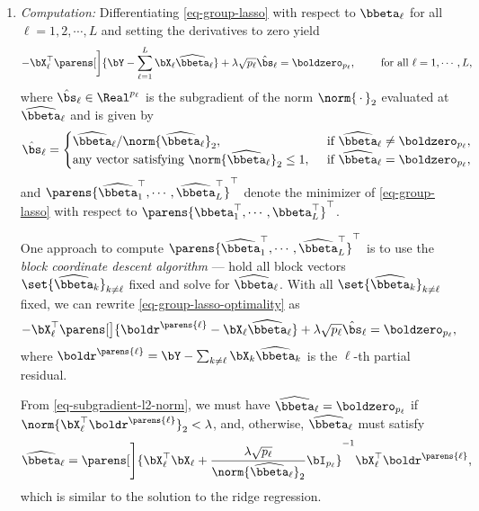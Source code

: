 \documentclass[12pt]{article}
\begin{document}
\begin{enumerate}[label=\textbf{\arabic*.}]
\begin{enumerate}
		\item \textit{Computation:} Differentiating \eqref{eq-group-lasso} with respect to $\bbeta_{\ell}$ for all $\ell = 1, 2, \cdots, L$ and setting the derivatives to zero yield 
		\begin{align}\label{eq-group-lasso-optimality}
			- \bX_{\ell}^\top \parens[\bigg]{\bY - \sum_{\ell=1}^L \bX_{\ell} \widehat{\bbeta}_{\ell} } + \lambda \sqrt{p_{\ell}} \hat{\bs}_{\ell} = \boldzero_{p_{\ell}}, \qquad \text{ for all } \ell = 1, \cdots, L, 
		\end{align}
		where $\hat{\bs}_{\ell} \in \Real^{p_{\ell}}$ is the subgradient of the norm $\norm{\,\cdot\,}_2$ evaluated at $\widehat{\bbeta}_{\ell}$ and is given by 
		\begin{align}\label{eq-subgradient-l2-norm}
			\hat{\bs}_{\ell} = \begin{cases}
				\widehat{\bbeta}_{\ell} / \norm{\widehat{\bbeta}_{\ell}}_2, & \, \text{ if } \widehat{\bbeta}_{\ell} \neq \boldzero_{p_\ell}, \\ 
				\text{any vector satisfying } \norm{\widehat{\bbeta}_{\ell}}_2 \le 1, & \, \text{ if } \widehat{\bbeta}_{\ell} = \boldzero_{p_\ell}, 
			\end{cases}
		\end{align}
		and $\parens{\widehat{\bbeta}_1^\top, \cdots, \widehat{\bbeta}_L^\top}^\top$ denote the minimizer of \eqref{eq-group-lasso} with respect to $\parens{\bbeta_1^\top, \cdots, \bbeta_L^\top}^\top$. 
		
		One approach to compute $\parens{\widehat{\bbeta}_1^\top, \cdots, \widehat{\bbeta}_L^\top}^\top$ is to use the \textit{block coordinate descent algorithm} --- hold all block vectors $\set{\widehat{\bbeta}_{k}}_{k \neq \ell}$ fixed and solve for $\widehat{\bbeta}_{\ell}$. With all $\set{\widehat{\bbeta}_{k}}_{k \neq \ell}$ fixed, we can rewrite \eqref{eq-group-lasso-optimality} as 
		\begin{align*}
			- \bX_{\ell}^\top \parens[\big]{\boldr^{\parens{\ell}} - \bX_{\ell} \widehat{\bbeta}_{\ell}} + \lambda \sqrt{p_{\ell}} \hat{\bs}_{\ell} = \boldzero_{p_{\ell}}, 
		\end{align*}
		where $\boldr^{\parens{\ell}} = \bY - \sum_{k \neq \ell} \bX_{k} \widehat{\bbeta}_{k}$ is the $\ell$-th partial residual. 
		
		From \eqref{eq-subgradient-l2-norm}, we must have $\widehat{\bbeta}_{\ell} = \boldzero_{p_{\ell}}$ if $\norm{\bX_{\ell}^{\top} \boldr^{\parens{\ell}}}_2 < \lambda$, and, otherwise, $\widehat{\bbeta}_{\ell}$ must satisfy 
		\begin{align}\label{eq-group-lasso-solution-1}
			\widehat{\bbeta}_{\ell} = \parens[\Bigg]{\bX_{\ell}^\top \bX_{\ell} + \frac{\lambda \sqrt{p_{\ell}}}{\norm{\widehat{\bbeta}_{\ell}}_2} \bI_{p_{\ell}}}^{-1} \bX_{\ell}^\top \boldr^{\parens{\ell}}, 
		\end{align}
		which is similar to the solution to the ridge regression. 
		

\end{enumerate}
\end{enumerate}
\end{document}
